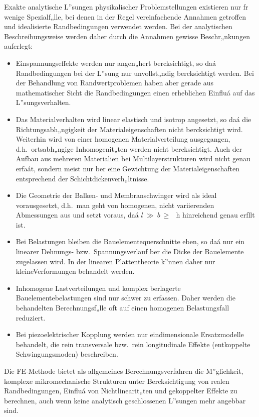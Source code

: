 Exakte analytische L”sungen physikalischer Problemstellungen
existieren nur fr wenige Spezialf„lle, bei denen in der Regel
vereinfachende Annahmen getroffen und idealisierte Randbedingungen
verwendet werden. Bei der analytischen Beschreibungsweise
werden daher durch die Annahmen gewisse Beschr„nkungen auferlegt:\\
%
\begin{itemize}
\item
Einspannungseffekte werden nur angen„hert bercksichtigt, so daá
Randbedingungen bei der L”sung nur unvollst„ndig bercksichtigt werden.
Bei der Behandlung von
Randwertproblemen haben aber gerade aus mathematischer Sicht die
Randbedingungen einen erheblichen Einfluá auf das L”sungsverhalten.
\item
Das Materialverhalten wird linear elastisch und isotrop angesetzt, so daá
die Richtungsabh„ngigkeit der Materialeigenschaften nicht bercksichtigt
wird. Weiterhin wird von einer homogenen Materialverteilung ausgegangen,
d.h.\ ortsabh„ngige Inhomogenit„ten werden nicht bercksichtigt. Auch der
Aufbau aus mehreren Materialien bei Multilayerstrukturen wird nicht genau
erfaát, sondern meist nur ber eine Gewichtung der Materialeigenschaften
entsprechend der Schichtdickenverh„ltnisse.
\item
Die Geometrie der Balken- und Membranschwinger wird als ideal
vorausgesetzt, d.h.\ man geht von homogenen, nicht variierenden
Abmessungen aus und setzt voraus, daá $l~\gg~b~\geq~$~h hinreichend genau
erfllt ist.
\item
Bei Belastungen bleiben die Bauelementequerschnitte eben, so daá
nur ein linearer Dehnungs- bzw.\ Spannungsverlauf ber die Dicke
der Bauelemente zugelassen wird. In der linearen Plattentheorie
k”nnen daher nur \glqq kleine\grqq Verformungen behandelt werden.
\item
Inhomogene Lastverteilungen und komplex berlagerte Bauelementebelastungen
sind nur schwer zu erfassen. Daher werden die behandelten Berechnungsf„lle
oft auf einen homogenen Belastungsfall reduziert.
\item
Bei piezoelektrischer Kopplung werden nur eindimensionale
Ersatzmodelle behandelt, die rein transversale bzw.\ rein longitudinale
Effekte (entkoppelte Schwingungsmoden) beschreiben.
\end{itemize}
%
Die FE-Methode bietet als allgemeines Berechnungsverfahren die
M”glichkeit, komplexe mikromechanische Strukturen unter Bercksichtigung
von realen Randbedingungen, Einfluá von Nichtlinearit„ten und gekoppelter
Effekte zu berechnen, auch wenn keine analytisch geschlossenen L”sungen
mehr angebbar sind.
